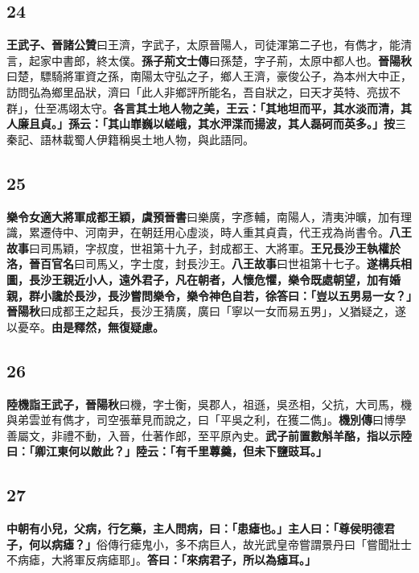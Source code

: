 \subsection*{24}

\textbf{王武子、}{\footnotesize \textbf{晉諸公贊}曰王濟，字武子，太原晉陽人，司徒渾第二子也，有儁才，能清言，起家中書郎，終太僕。}\textbf{孫子荊}{\footnotesize \textbf{文士傳}曰孫楚，字子荊，太原中都人也。\textbf{晉陽秋}曰楚，驃騎將軍資之孫，南陽太守弘之子，鄉人王濟，豪俊公子，為本州大中正，訪問弘為鄉里品狀，濟曰「此人非鄉評所能名，吾自狀之，曰天才英特、亮拔不群」，仕至馮翊太守。}\textbf{各言其土地人物之美，王云：「其地坦而平，其水淡而清，其人廉且貞。」孫云：「其山㠑巍以嵯峨，其水㳌渫而揚波，其人磊砢而英多。」}{\footnotesize \textbf{按}三秦記、語林載蜀人伊籍稱吳土地人物，與此語同。}

\subsection*{25}

\textbf{樂令女適大將軍成都王穎，}{\footnotesize \textbf{虞預晉書}曰樂廣，字彥輔，南陽人，清夷沖曠，加有理識，累遷侍中、河南尹，在朝廷用心虛淡，時人重其貞貴，代王戎為尚書令。\textbf{八王故事}曰司馬穎，字叔度，世祖第十九子，封成都王、大將軍。}\textbf{王兄長沙王執權於洛，}{\footnotesize \textbf{晉百官名}曰司馬乂，字士度，封長沙王。\textbf{八王故事}曰世祖第十七子。}\textbf{遂構兵相圖，長沙王親近小人，遠外君子，凡在朝者，人懷危懼，樂令既處朝望，加有婚親，群小讒於長沙，長沙嘗問樂令，樂令神色自若，徐答曰：「豈以五男易一女？」}{\footnotesize \textbf{晉陽秋}曰成都王之起兵，長沙王猜廣，廣曰「寧以一女而易五男」，乂猶疑之，遂以憂卒。}\textbf{由是釋然，無復疑慮。}

\subsection*{26}

\textbf{陸機詣王武子，}{\footnotesize \textbf{晉陽秋}曰機，字士衡，吳郡人，祖遜，吳丞相，父抗，大司馬，機與弟雲並有儁才，司空張華見而說之，曰「平吳之利，在獲二儁」。\textbf{機別傳}曰博學善屬文，非禮不動，入晉，仕著作郎，至平原內史。}\textbf{武子前置數斛羊酪，指以示陸曰：「卿江東何以敵此？」陸云：「有千里蓴羹，但未下鹽豉耳。」}

\subsection*{27}

\textbf{中朝有小兒，父病，行乞藥，主人問病，曰：「患瘧也。」主人曰：「尊侯明德君子，何以病瘧？」}{\footnotesize 俗傳行瘧鬼小，多不病巨人，故光武皇帝嘗謂景丹曰「嘗聞壯士不病瘧，大將軍反病瘧耶」。}\textbf{答曰：「來病君子，所以為瘧耳。」}

